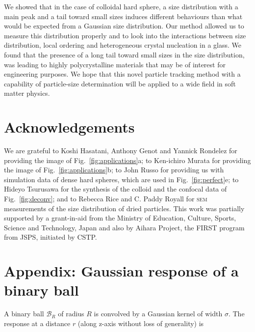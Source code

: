 \documentclass[8.5pt,twoside,twocolumn]{article}
\begin{document}
We showed that in the case of colloidal hard sphere, a size distribution with a main peak and a tail toward small sizes induces different behaviours than what would be expected from a Gaussian size distribution. Our method allowed us to measure this distribution properly and to look into the interactions between size distribution, local ordering and heterogeneous crystal nucleation in a glass. We found that the presence of a long tail toward small sizes in the size distribution, was leading to highly polycrystalline materials that may be of interest for engineering purposes.
We hope that this novel particle tracking method with a capability of particle-size determination will be applied to a wide field in soft matter physics. 

\section*{Acknowledgements}
We are grateful to Koshi Hasatani, Anthony Genot and Yannick Rondelez for providing the image of Fig.~\ref{fig:applications}a; to Ken-ichiro Murata for providing the image of Fig.~\ref{fig:applications}b; to John Russo for providing us with simulation data of dense hard spheres, which are used in Fig.~\ref{fig:perfect}e; to Hideyo Tsurusawa for the synthesis of the colloid and the confocal data of Fig.~\ref{fig:deconv}; and to Rebecca Rice and C. Paddy Royall for \textsc{sem} measurements of the size distribution of dried particles. 
This work was partially supported by a grant-in-aid from the 
Ministry of Education, Culture, Sports, Science and Technology, Japan and also by 
Aihara Project, the FIRST program from JSPS, initiated by CSTP. 




\appendix
\section*{Appendix: Gaussian response of a binary ball}
\label{sec:gaussian_vs_ball}

A binary ball $\mathcal{B}_R$ of radius $R$ is convolved by a Gaussian kernel of width $\sigma$. The response at a distance $r$ (along z-axis without loss of generality) is
\end{document}
